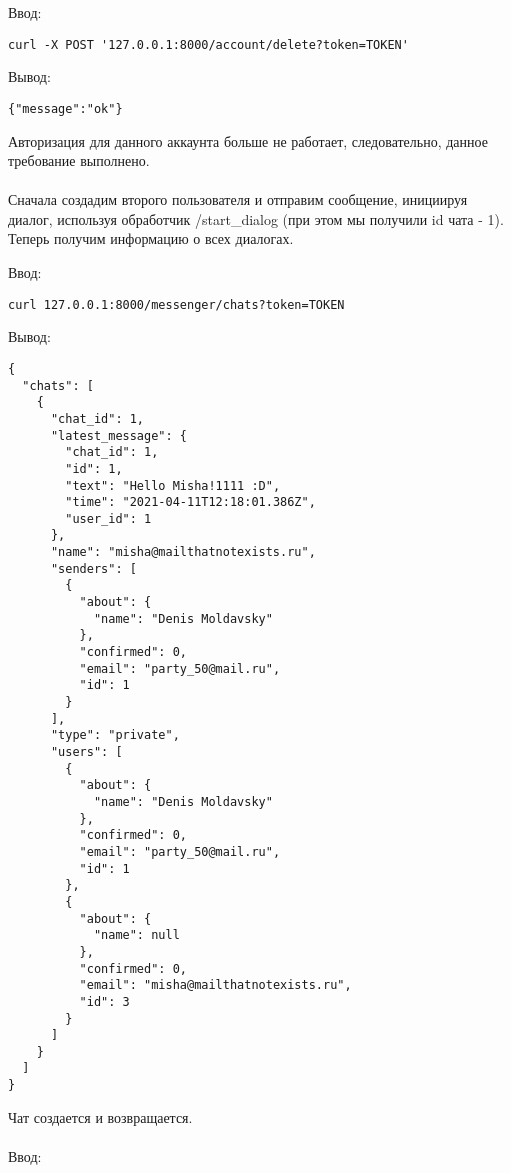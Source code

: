 \documentclass[testmethods]{espd}
\begin{document}
Ввод:

\begin{verbatim}
curl -X POST '127.0.0.1:8000/account/delete?token=TOKEN'
\end{verbatim}

Вывод:

\begin{verbatim}
{"message":"ok"}
\end{verbatim}

Авторизация для данного аккаунта больше не работает, следовательно, данное требование выполнено.

\paragraph{} %
Сначала создадим второго пользователя и отправим сообщение, инициируя диалог, используя обработчик /start\_dialog (при этом мы получили id чата - 1). Теперь получим информацию о всех диалогах.

Ввод:

\begin{verbatim}
curl 127.0.0.1:8000/messenger/chats?token=TOKEN
\end{verbatim}

Вывод:

\begin{verbatim}
{
  "chats": [
    {
      "chat_id": 1,
      "latest_message": {
        "chat_id": 1,
        "id": 1,
        "text": "Hello Misha!1111 :D",
        "time": "2021-04-11T12:18:01.386Z",
        "user_id": 1
      },
      "name": "misha@mailthatnotexists.ru",
      "senders": [
        {
          "about": {
            "name": "Denis Moldavsky"
          },
          "confirmed": 0,
          "email": "party_50@mail.ru",
          "id": 1
        }
      ],
      "type": "private",
      "users": [
        {
          "about": {
            "name": "Denis Moldavsky"
          },
          "confirmed": 0,
          "email": "party_50@mail.ru",
          "id": 1
        },
        {
          "about": {
            "name": null
          },
          "confirmed": 0,
          "email": "misha@mailthatnotexists.ru",
          "id": 3
        }
      ]
    }
  ]
}
\end{verbatim}

 Чат создается и возвращается.

\paragraph{} %
Ввод:
\end{document}

